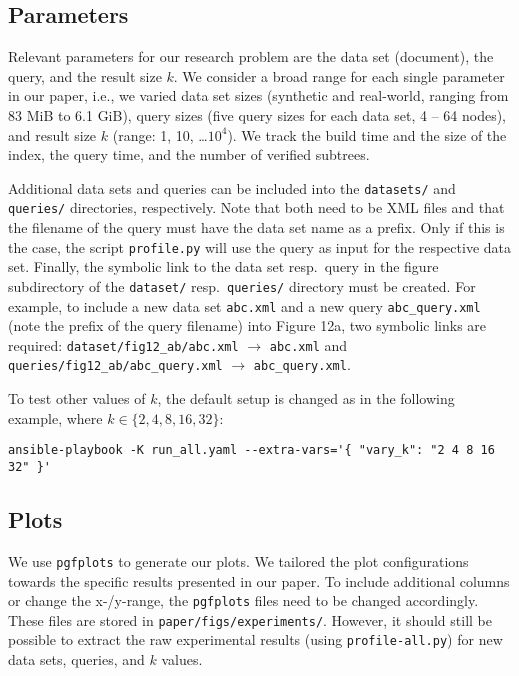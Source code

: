 \documentclass[a4, 10pt]{article}
\begin{document}
\subsection{Parameters}

Relevant parameters for our research problem are the data set (document), the query, and the result size $k$. We consider a broad range for each single parameter in our paper, i.e., we varied data set sizes (synthetic and real-world, ranging from 83 MiB to 6.1 GiB), query sizes (five query sizes for each data set, 4 -- 64 nodes), and result size $k$ (range: 1, 10, \ldots $10^4$). We track the build time and the size of the index, the query time, and the number of verified subtrees.

Additional data sets and queries can be included into the \texttt{datasets/} and \texttt{queries/} directories, respectively. Note that both need to be XML files and that the filename of the query must have the data set name as a prefix. Only if this is the case, the script \texttt{profile.py} will use the query as input for the respective data set. Finally, the symbolic link to the data set resp.\ query in the figure subdirectory of the \texttt{dataset/} resp.\ \texttt{queries/} directory must be created. For example, to include a new data set \texttt{abc.xml} and a new query \texttt{abc\_query.xml} (note the prefix of the query filename) into Figure 12a, two symbolic links are required: \texttt{dataset/fig12\_ab/abc.xml} $\rightarrow$ \texttt{abc.xml} and \texttt{queries/fig12\_ab/abc\_query.xml} $\rightarrow$ \texttt{abc\_query.xml}.

To test other values of $k$, the default setup is changed as in the following example, where $k \in \{ 2, 4, 8, 16, 32 \}$:

\begin{lstlisting}[style=custombash]
ansible-playbook -K run_all.yaml --extra-vars='{ "vary_k": "2 4 8 16 32" }'
\end{lstlisting}

\subsection{Plots}

We use \texttt{pgfplots} to generate our plots. We tailored the plot configurations towards the specific results presented in our paper. To include additional columns or change the x-/y-range, the \texttt{pgfplots} files need to be changed accordingly. These files are stored in \texttt{paper/figs/experiments/}. However, it should still be possible to extract the raw experimental results (using \texttt{profile-all.py}) for new data sets, queries, and $k$ values.
\end{document}
